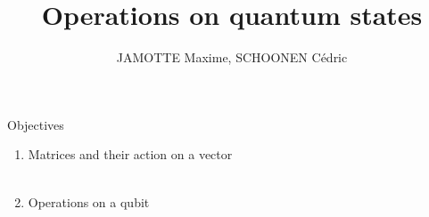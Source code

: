 \documentclass[aspectratio=169,12pt]{beamer}
\begin{document}
\title{Operations on quantum states}
\author{JAMOTTE Maxime, SCHOONEN Cédric}
\date{}

\begin{frame}
  \titlepage
\end{frame}

\begin{frame}{Objectives}
  \begin{enumerate}
    \item Matrices and their action on a vector\\~\\
    \item Operations on a qubit\\~\\
  \end{enumerate}
\end{frame}
\end{document}
